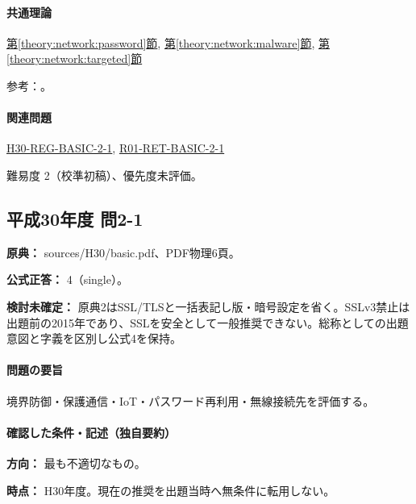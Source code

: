 \paragraph{共通理論} \hyperref[theory:network:password]{第\ref*{theory:network:password}節}, \hyperref[theory:network:malware]{第\ref*{theory:network:malware}節}, \hyperref[theory:network:targeted]{第\ref*{theory:network:targeted}節}

\par 参考：\cite{net_nist2017,net_target2020,net_ipa_account}。

\paragraph{関連問題} \hyperref[q:h30-reg-basic-2-1]{H30-REG-BASIC-2-1}, \hyperref[q:r01-ret-basic-2-1]{R01-RET-BASIC-2-1}

\par 難易度 2（校準初稿）、優先度未評価。

\subsection{平成30年度 問2-1}
\label{q:h30-reg-basic-2-1}

\noindent\textbf{原典：} sources/H30/basic.pdf、PDF物理6頁。

\textbf{公式正答：} 4（single）。

\par\textbf{検討未確定：} 原典2はSSL/TLSと一括表記し版・暗号設定を省く。SSLv3禁止は出題前の2015年であり、SSLを安全として一般推奨できない。総称としての出題意図と字義を区別し公式4を保持。

\paragraph{問題の要旨} 境界防御・保護通信・IoT・パスワード再利用・無線接続先を評価する。

\paragraph{確認した条件・記述（独自要約）}\mbox{}\par

\noindent\textbf{方向：} 最も不適切なもの。\par

\noindent\textbf{時点：} H30年度。現在の推奨を出題当時へ無条件に転用しない。\par

